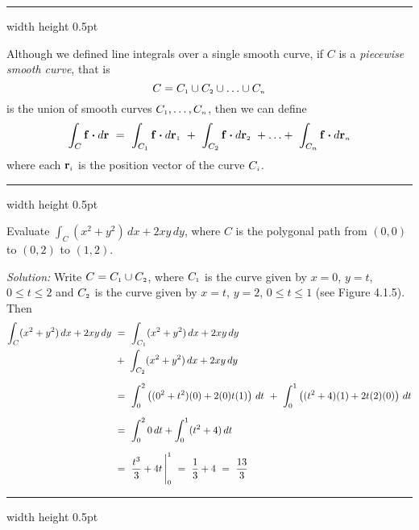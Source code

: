 \hrule width \textwidth height 0.5pt
\medskip

Although we defined line integrals over a single smooth curve, if $C$ is a \emph{piecewise smooth curve}, that
is
\begin{displaymath}
 C = C_{\scriptscriptstyle 1} \cup C_{\scriptscriptstyle 2} \cup \ldots \cup C_{\scriptscriptstyle n}
\end{displaymath}
is the union of smooth curves $C_{\scriptscriptstyle 1},\ldots ,C_{\scriptscriptstyle n}$, then we can define
\begin{displaymath}
 \int_C \mathbf{f} \bm{\cdot} d\mathbf{r} ~=~ \int_{C_{\scriptscriptstyle 1}} \mathbf{f} \bm{\cdot} d\mathbf{r}_{\scriptscriptstyle 1} ~+~
  \int_{C_{\scriptscriptstyle 2}} \mathbf{f} \bm{\cdot} d\mathbf{r}_{\scriptscriptstyle 2} ~+ \ldots +~
  \int_{C_{\scriptscriptstyle n}} \mathbf{f} \bm{\cdot} d\mathbf{r}_{\scriptscriptstyle n}
\end{displaymath}
where each $\mathbf{r}_{\scriptscriptstyle i}$ is the position vector of the curve $C_{\scriptscriptstyle i}$.

\medskip
\hrule width \textwidth height 0.5pt
\begin{exmp}\label{exmp:lineintexmppoly}
 Evaluate $\int_C (x^2 + y^2 )\,dx + 2xy\,dy$, where $C$ is the polygonal path from $(0,0)$ to $(0,2)$ to
 $(1,2)$.\smallskip

 \piccaption[]{}
 \par\noindent \emph{Solution:} Write $C = C_{\scriptscriptstyle 1} \cup C_{\scriptscriptstyle 2}$, where $C_{\scriptscriptstyle 1}$ is the curve given by
 $x=0$, $y=t$, $0 \le t \le 2$ and $C_{\scriptscriptstyle 2}$ is the curve given by $x=t$, $y=2$, $0 \le t \le 1$ (see Figure
 4.1.5). Then
 \begin{align*}
  \int_C (x^2 + y^2 )\,dx + 2xy\,dy ~&=~ \int_{C_{\scriptscriptstyle 1}} (x^2 + y^2 )\,dx + 2xy\,dy\\
   &+~ \int_{C_{\scriptscriptstyle 2}} (x^2 + y^2 )\,dx + 2xy\,dy\\[6pt]
   &=~ \int_0^2 \left( (0^2 + t^2 )(0) + 2(0)t(1) \right) \,dt ~+~
    \int_0^1 \left( (t^2 + 4 )(1) + 2t(2)(0) \right) \,dt\\[6pt]
   &=~ \int_0^2 0\,dt + \int_0^1 (t^2 + 4 )\,dt\\[6pt]
   &=~ \frac{t^3}{3} + 4t \,\Bigg|_0^1 ~=~ \frac{1}{3} + 4 ~=~ \frac{13}{3}
 \end{align*}
\end{exmp}
\hrule width \textwidth height 0.5pt
\medskip

